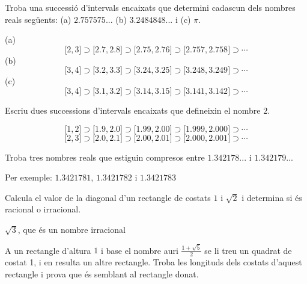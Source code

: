 \begin{exercici}
Troba una successió d’intervals encaixats que determini cadascun dels nombres reals següents: (a) $2.757575...$ (b) $%
3.2484848...$ i (c) $\pi $.

\end{exercici}

\begin{indicacio}
(a)%
\[
\lbrack 2,3]\supset \lbrack 2.7,2.8]\supset \lbrack 2.75,2.76]\supset
\lbrack 2.757,2.758]\supset \cdots 
\]%
(b)%
\[
\lbrack 3,4]\supset \lbrack 3.2,3.3]\supset \lbrack 3.24,3.25]\supset
\lbrack 3.248,3.249]\supset \cdots 
\]%
(c)%
\[
\lbrack 3,4]\supset \lbrack 3.1,3.2]\supset \lbrack 3.14,3.15]\supset
\lbrack 3.141,3.142]\supset \cdots 
\]
\end{indicacio}

\begin{exercici}
Escriu dues successions d’intervals encaixats que defineixin el nombre $2$.

\end{exercici}

\begin{indicacio}
%
\[
\lbrack 1,2]\supset \lbrack 1.9,2.0]\supset \lbrack 1.99,2.00]\supset
\lbrack 1.999,2.000]\supset \cdots 
\]%
\[
\lbrack 2,3]\supset \lbrack 2.0,2.1]\supset \lbrack 2.00,2.01]\supset
\lbrack 2.000,2.001]\supset \cdots 
\]
\end{indicacio}

\begin{exercici}
Troba tres nombres reals que estiguin compresos entre $%
1.342178...$ i $1.342179...$

\end{exercici}

\begin{indicacio}
Per exemple: $1.3421781$, $1.3421782$ i $1.3421783$
\end{indicacio}

\begin{exercici}
Calcula el valor de la diagonal d’un rectangle de costats $1$ i $%
\sqrt{2}$ i determina si és racional o irracional.

\end{exercici}

\begin{indicacio}
$\sqrt{3}$, que és un nombre irracional
\end{indicacio}

\begin{exercici}
A un rectangle d’altura $1$ i base el nombre auri $%
\frac{1+\sqrt{5}}{2}$ se li treu un quadrat de costat 1, i en resulta un altre rectangle. Troba les longituds dels costats d’aquest rectangle i
prova que és semblant al rectangle donat.

\end{exercici}

